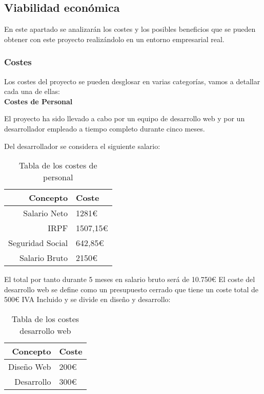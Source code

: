 \subsection{Viabilidad económica}
En este apartado se analizarán los costes y los posibles beneficios que se pueden obtener con este proyecto realizándolo en un entorno empresarial real.

\subsubsection{Costes}

Los costes del proyecto se pueden desglosar en varias categorías, vamos a detallar cada una de ellas:
\\
\textbf{Costes de Personal}

El proyecto ha sido llevado a cabo por un equipo de desarrollo web y por un desarrollador empleado a tiempo completo durante cinco meses.

Del desarrollador se considera el siguiente salario:

 \begin{table}[h]
\begin{tabular}{| r | l |}
\hline
Concepto & Coste \\
\hline
Salario Neto & 1281€ \\
\hline
IRPF & 1507,15€ \\
\hline
Seguridad Social & 642,85€ \\
\hline
Salario Bruto & 2150€ \\
\hline
\end{tabular}
   \caption{Tabla de los costes de personal }
   \label{A.2}
 \end{table}
El total por tanto durante 5 meses en salario bruto será de 10.750€
El coste del desarrollo web se define como un presupuesto cerrado que tiene un coste total de 500€ IVA Incluido y se divide en diseño y desarrollo:

 \begin{table}[h]
\begin{tabular}{| r | l |}
\hline
Concepto & Coste \\
\hline
Diseño Web & 200€ \\
\hline
Desarrollo & 300€ \\
\hline
\end{tabular}
   \caption{Tabla de los costes desarrollo web}
   \label{A.3}
 \end{table}
 
